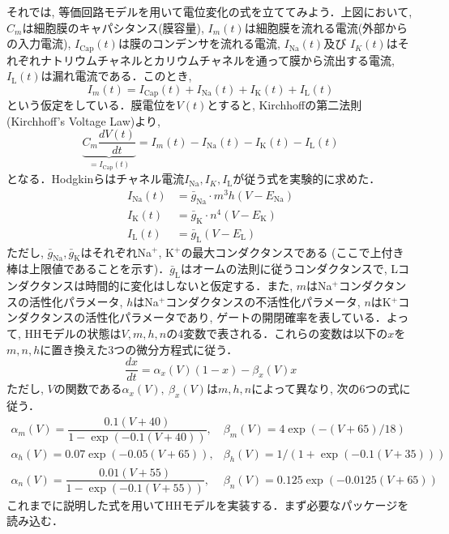 \documentclass[titlepage]{ltjsbook}
\begin{document}
それでは, 等価回路モデルを用いて電位変化の式を立ててみよう．上図において, $C_m$は細胞膜のキャパシタンス(膜容量), $I_{m}(t)$は細胞膜を流れる電流(外部からの入力電流), $I_\text{Cap}(t)$は膜のコンデンサを流れる電流, $I_\text{Na}(t)$及び $I_K(t)$はそれぞれナトリウムチャネルとカリウムチャネルを通って膜から流出する電流, $I_\text{L}(t)$は漏れ電流である．このとき, 
\begin{equation}
I_{m}(t)=I_\text{Cap}(t)+I_\text{Na}(t)+I_\text{K}(t)+I_\text{L}(t)    
\end{equation}
という仮定をしている．膜電位を$V(t)$とすると, Kirchhoffの第二法則 (Kirchhoff's Voltage Law)より, 
\begin{equation}
\underbrace{C_m\frac {dV(t)}{dt}}_{= I_\text{Cap} (t)}=I_{m}(t)-I_\text{Na}(t)-I_\text{K}(t)-I_\text{L}(t)
\end{equation}
となる．Hodgkinらはチャネル電流$I_\text{Na}, I_K, I_\text{L}$が従う式を実験的に求めた．
\begin{align}
I_\text{Na}(t) &= \bar{g}_{\text{Na}}\cdot m^{3}h(V-E_{\text{Na}})\\
I_\text{K}(t) &= \bar{g}_{\text{K}}\cdot n^{4}(V-E_{\text{K}})\\
I_\text{L}(t) &= \bar{g}_{\text{L}}(V-E_{\text{L}})
\end{align}
ただし, $\bar{g}_{\text{Na}}, \bar{g}_{\text{K}}$はそれぞれNa$^+$, K$^+$の最大コンダクタンスである (ここで上付き棒は上限値であることを示す)．$\bar{g}_{\text{L}}$はオームの法則に従うコンダクタンスで, Lコンダクタンスは時間的に変化はしないと仮定する．また, $m$はNa$^+$コンダクタンスの活性化パラメータ, $h$はNa$^+$コンダクタンスの不活性化パラメータ, $n$はK$^+$コンダクタンスの活性化パラメータであり, ゲートの開閉確率を表している．よって, HHモデルの状態は$V, m, h, n$の4変数で表される．これらの変数は以下の$x$を$m, n, h$に置き換えた3つの微分方程式に従う． 
\begin{equation}
\frac{dx}{dt}=\alpha_{x}(V)(1-x)-\beta_{x}(V)x
\end{equation}
ただし, $V$の関数である$\alpha_{x}(V),\ \beta_{x}(V)$は$m, h, n$によって異なり, 次の6つの式に従う．
\begin{equation}
\begin{array}{ll}
\alpha_{m}(V)=\dfrac {0.1(V+40)}{1-\exp (-0.1(V+40))}, &\beta_{m}(V)=4\exp {(-(V+65)/18)}\\
\alpha_{h}(V)=0.07\exp {(-0.05(V+65))}, & \beta_{h}(V)=1/(1+{\exp {\left(-0.1(V+35)\right)}})\\
\alpha_{n}(V)={\dfrac {0.01(V+55)}{1-\exp {\left(-0.1(V+55)\right)}}},& \beta_{n}(V)=0.125\exp {(-0.0125(V+65))} 
\end{array}
\end{equation}
これまでに説明した式を用いてHHモデルを実装する．まず必要なパッケージを読み込む．
\end{document}
